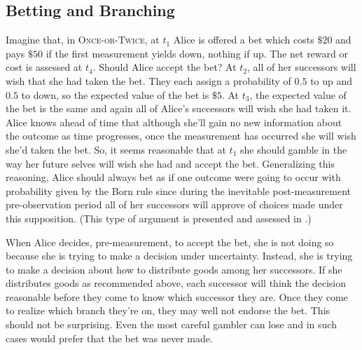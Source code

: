 \documentclass[12pt,onecolumn,secnumarabic,amsmath,amssymb,balancelastpage,nofootinbib]{article}
\begin{document}
\subsection{Betting and Branching}\label{betandbranch}

Imagine that, in \textsc{Once-or-Twice}, at $t_1$ Alice is offered a bet which costs $\$20$ and pays $\$50$ if the {first measurement yields} down, nothing if up. The net reward or cost is assessed at $t_4$.  Should Alice accept the bet?  At $t_2$, all of her successors will wish that she had taken the bet.  They each assign a probability of $0.5$ to up and $0.5$ to down, so the expected value of the bet is $\$5$.  At $t_3$, the expected value of the bet is the same and again all of Alice's successors will wish she had taken it.  Alice knows ahead of time that although she'll gain no new information about the outcome as time progresses, once the measurement has occurred she will wish she'd taken the bet.  So, it seems reasonable that at $t_1$ she should {gamble} in the way her future selves will wish she had and accept the bet. Generalizing this reasoning, Alice should {always} bet as if one outcome were going to occur with probability given by the Born rule since during the inevitable post-measurement pre-observation period all of her successors will approve of choices made under this supposition. (This type of argument is presented and assessed in \citealp[][]{tappenden2011}.)

When Alice decides, pre-measurement, to accept the bet, she is not doing so because she is trying to make a decision under uncertainty.  Instead, she is trying to make a decision about how to distribute goods among her successors.  If she distributes goods as recommended above, each successor will think the decision reasonable before they come to know which successor they are.  Once they come to realize which branch they're on, they may well not endorse the bet.  This should not be surprising.  Even the most careful gambler can lose and in such cases would prefer that the bet was never made.
\end{document}
